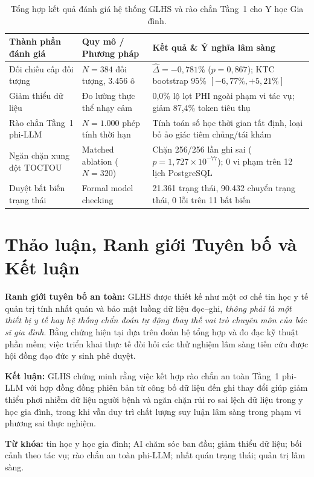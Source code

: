 \documentclass[11pt]{article}
\begin{document}
\begin{table}[H]\centering\small
\caption{Tổng hợp kết quả đánh giá hệ thống GLHS và rào chắn Tầng~1 cho Y học Gia đình.}
\vspace{0.4em}
\begin{tabularx}{\textwidth}{p{}p{}X}
\toprule
\textbf{Thành phần đánh giá} & \textbf{Quy mô / Phương pháp} & \textbf{Kết quả \& Ý nghĩa lâm sàng} \\
\midrule
Đối chiếu cấp đối tượng & $N=384$ đối tượng, 3.456 ô & $\hat{\Delta} = -0{,}781\%$ ($p=0{,}867$); KTC bootstrap 95\% $[-6{,}77\%, +5{,}21\%]$ \\
Giảm thiểu dữ liệu & Đo lường thực thể nhạy cảm & 0{,}0\% lộ lọt PHI ngoài phạm vi tác vụ; giảm 87{,}4\% token tiêu thụ \\
Rào chắn Tầng~1 phi-LLM & $N=1.000$ phép tính thời hạn & Tính toán số học thời gian tất định, loại bỏ ảo giác tiêm chủng/tái khám \\
Ngăn chặn xung đột TOCTOU & Matched ablation ($N=320$) & Chặn 256/256 lần ghi sai ($p=1{,}727 \times 10^{-77}$); 0 vi phạm trên 12 lịch PostgreSQL \\
Duyệt bất biến trạng thái & Formal model checking & 21.361 trạng thái, 90.432 chuyển trạng thái, 0 lỗi trên 11 bất biến \\
\bottomrule
\end{tabularx}
\end{table}

\section{Thảo luận, Ranh giới Tuyên bố và Kết luận}
\textbf{Ranh giới tuyên bố an toàn:} GLHS được thiết kế như một cơ chế tin học y tế quản trị tính nhất quán và bảo mật luồng dữ liệu đọc--ghi, \emph{không phải là một thiết bị y tế hay hệ thống chẩn đoán tự động thay thế vai trò chuyên môn của bác sĩ gia đình}. Bằng chứng hiện tại dựa trên đoàn hệ tổng hợp và đo đạc kỹ thuật phần mềm; việc triển khai thực tế đòi hỏi các thử nghiệm lâm sàng tiến cứu được hội đồng đạo đức y sinh phê duyệt.

\textbf{Kết luận:} GLHS chứng minh rằng việc kết hợp rào chắn an toàn Tầng~1 phi-LLM với hợp đồng đồng phiên bản từ công bố dữ liệu đến ghi thay đổi giúp giảm thiểu phơi nhiễm dữ liệu người bệnh và ngăn chặn rủi ro sai lệch dữ liệu trong y học gia đình, trong khi vẫn duy trì chất lượng suy luận lâm sàng trong phạm vi phương sai thực nghiệm.

\textbf{Từ khóa:} tin học y học gia đình; AI chăm sóc ban đầu; giảm thiểu dữ liệu; bối cảnh theo tác vụ; rào chắn an toàn phi-LLM; nhất quán trạng thái; quản trị lâm sàng.
\end{document}
